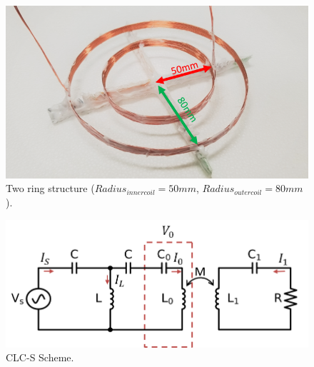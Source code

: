 \begin{figure}[htbp]
    \centering
    \includegraphics[width=0.7\linewidth]{images/3_two_ring_coil_5cm_8cm.png}
    \caption{Two ring structure ($Radius_{inner coil}=50mm$, $Radius_{outer coil}=80mm$).}
    \label{fig:3_two_ring_coil_5cm_8cm}
\end{figure}

\begin{figure}[htbp]
    \centering
    \includegraphics[width=0.8\linewidth]{images/3_clc_s_scheme.png}
    \caption{CLC-S Scheme.}
    \label{fig:3_clc_s_scheme}
\end{figure}